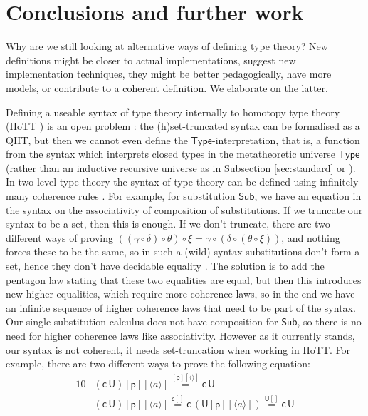 \documentclass[a4paper,UKenglish,cleveref, autoref, thm-restate]{lipics-v2021}
\newcommand{\Sub}{\mathsf{Sub}}
\newcommand{\p}{\mathsf{p}}
\newcommand{\U}{\mathsf{U}}
\newcommand{\cd}{\mathsf{c}}
\newcommand{\Type}{\mathsf{Type}}
\begin{document}
\section{Conclusions and further work}
\label{sec:conclusion}

Why are we still looking at alternative ways of defining type theory?
New definitions might be closer to actual implementations, suggest new
implementation techniques, they might be better pedagogically, have
more models, or contribute to a coherent definition. We elaborate on
the latter.

Defining a useable syntax of type theory internally to homotopy type
theory (HoTT \cite{HoTTbook}) is an open problem \cite{mike,nicolai}: the (h)set-truncated
syntax can be formalised as a QIIT, but then we cannot even define the
$\Type$-interpretation, that is, a function from the syntax which
interprets closed types in the metatheoretic universe $\Type$ (rather
than an inductive recursive universe as in Subsection
\ref{sec:standard} or \cite[Section
  4]{DBLP:conf/popl/AltenkirchK16}). In two-level type theory the
syntax of type theory can be defined using infinitely many coherence
rules \cite{DBLP:conf/lics/Kraus21}. For example, for substitution
$\Sub$, we have an equation in the syntax on the associativity of composition of substitutions.
If we truncate our syntax to be a set, then this is
enough. If we don't truncate, there are two different ways of proving
$((\gamma\circ\delta)\circ\theta)\circ\xi =
\gamma\circ(\delta\circ(\theta\circ\xi))$, and nothing forces these to
be the same, so in such a (wild) syntax substitutions don't form a
set, hence they don't have decidable equality \cite{hedberg}. The
solution is to add the pentagon law stating that these two equalities are equal, but then this introduces new
higher equalities, which require more coherence laws, so in the end we
have an infinite sequence of higher coherence laws that need to be
part of the syntax. Our single substitution calculus does not have
composition for $\Sub$, so there is no need for higher coherence laws
like associativity. However as it currently stands, our syntax is not
coherent, it needs set-truncation when working in HoTT. For example,
there are two different ways to prove the following equation:
\begin{alignat*}{10}
  & (\cd\,\U)[\p][\langle a\rangle] \overset{[\p][\langle\rangle]}{=} \cd\,\U \\
  & (\cd\,\U)[\p][\langle a\rangle] \overset{\cd[]}{=} \cd\,(\U[\p][\langle a\rangle]) \overset{\U[]}{=} \cd\,\U
\end{alignat*}
\end{document}
